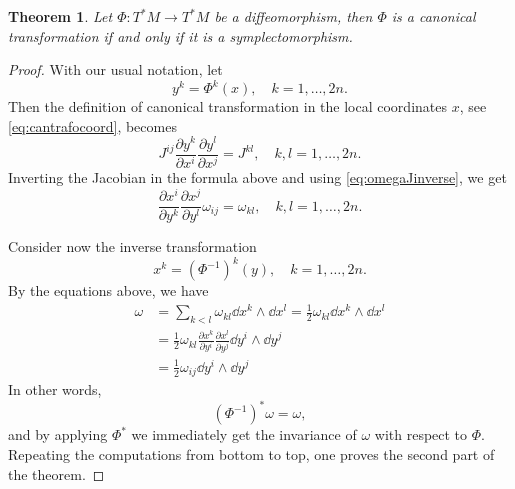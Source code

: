 \documentclass[english,fontsize=11pt,paper=b5]{scrbook}
\numberwithin{equation}{chapter}
\newtheorem{theorem}{Theorem}[chapter]
\theoremstyle{definition}
\begin{document}
    \begin{theorem}\label{thm:ctiffs}
      Let $\Phi: T^*M \to T^*M$ be a diffeomorphism, then $\Phi$ is a canonical transformation if and only if it is a symplectomorphism.
    \end{theorem}
    \begin{proof}
      With our usual notation, let
      \begin{equation}
        y^k = \Phi^k(x),\quad k=1,\ldots,2n.
      \end{equation}
      Then the definition of canonical transformation in the local coordinates $x$, see \eqref{eq:cantrafocoord}, becomes
      \begin{equation}
        J^{ij}\frac{\partial y^k}{\partial x^i}\frac{\partial y^l}{\partial x^j} = J^{kl},
        \quad k,l = 1,\ldots,2n.
      \end{equation}
      Inverting the Jacobian in the formula above and using \eqref{eq:omegaJinverse}, we get
      \begin{equation}
        \frac{\partial x^i}{\partial y^k}\frac{\partial x^j}{\partial y^l} \omega_{ij}= \omega_{kl},
        \quad k,l = 1,\ldots,2n.
      \end{equation}

      Consider now the inverse transformation
      \begin{equation}
        x^k = \left(\Phi^{-1}\right)^k(y),\quad k=1,\ldots,2n.
      \end{equation}
      By the equations above, we have
      \begin{align}
        \omega
     & = \sum_{k<l} \omega_{kl}\dd x^k \wedge \dd x^l
     = \frac12 \omega_{kl} \dd x^k \wedge \dd x^l                                                                       \\
     & = \frac12 \omega_{kl} \frac{\partial x^k}{\partial y^i}\frac{\partial x^l}{\partial y^j} \dd y^i \wedge \dd y^j \\
     & = \frac12 \omega_{ij} \dd y^i \wedge \dd y^j
      \end{align}
      In other words,
      \begin{equation}
        \left(\Phi^{-1}\right)^* \omega = \omega,
      \end{equation}
      and by applying $\Phi^*$ we immediately get the invariance of $\omega$ with respect to $\Phi$.
      Repeating the computations from bottom to top, one proves the second part of the theorem.
    \end{proof}
\end{document}
